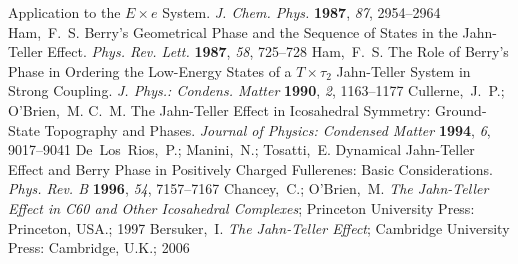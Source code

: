 \documentclass[superscriptaddress,showpacs,amsmath,amssymb,pra,twocolumn]{revtex4-1}
\begin{document}
\begin{thebibliography}{61}
  {{Application}} to the $E \times e$ System. \emph{J. Chem. Phys.} \textbf{1987}, \emph{87}, 2954--2964\relax
\mciteBstWouldAddEndPuncttrue
\mciteSetBstMidEndSepPunct{\mcitedefaultmidpunct}
{\mcitedefaultendpunct}{\mcitedefaultseppunct}\relax
\EndOfBibitem
{}
Ham,~F.~S. Berry's Geometrical Phase and the Sequence of States in the
  {{Jahn}}-{{Teller}} Effect. \emph{Phys. Rev. Lett.} \textbf{1987},
  \emph{58}, 725--728\relax
\mciteBstWouldAddEndPuncttrue
\mciteSetBstMidEndSepPunct{\mcitedefaultmidpunct}
{\mcitedefaultendpunct}{\mcitedefaultseppunct}\relax
\EndOfBibitem
{}
Ham,~F.~S. The Role of {{Berry}}'s Phase in Ordering the Low-Energy States of a
  $T \times \tau_2$ Jahn-Teller System in Strong Coupling. \emph{J. Phys.: Condens. Matter} \textbf{1990}, \emph{2}, 1163--1177\relax
\mciteBstWouldAddEndPuncttrue
\mciteSetBstMidEndSepPunct{\mcitedefaultmidpunct}
{\mcitedefaultendpunct}{\mcitedefaultseppunct}\relax
\EndOfBibitem
{}
Cullerne,~J.~P.; O'Brien,~M. C.~M. The {{Jahn}}-{{Teller}} Effect in
  Icosahedral Symmetry: Ground-State Topography and Phases. \emph{Journal of
  Physics: Condensed Matter} \textbf{1994}, \emph{6}, 9017--9041\relax
\mciteBstWouldAddEndPuncttrue
\mciteSetBstMidEndSepPunct{\mcitedefaultmidpunct}
{\mcitedefaultendpunct}{\mcitedefaultseppunct}\relax
\EndOfBibitem
{}
De~Los~Rios,~P.; Manini,~N.; Tosatti,~E. Dynamical {{Jahn}}-{{Teller}} Effect
  and {{Berry}} Phase in Positively Charged Fullerenes: {{Basic}}
  Considerations. \emph{Phys. Rev. B} \textbf{1996}, \emph{54},
  7157--7167\relax
\mciteBstWouldAddEndPuncttrue
\mciteSetBstMidEndSepPunct{\mcitedefaultmidpunct}
{\mcitedefaultendpunct}{\mcitedefaultseppunct}\relax
\EndOfBibitem
{}
Chancey,~C.; O'Brien,~M. \emph{The {{Jahn}}-{{Teller}} Effect in {{C60}} and
  Other Icosahedral Complexes}; {Princeton University Press: Princeton, USA.; 1997}\relax
\mciteBstWouldAddEndPuncttrue
\mciteSetBstMidEndSepPunct{\mcitedefaultmidpunct}
{\mcitedefaultendpunct}{\mcitedefaultseppunct}\relax
\EndOfBibitem
{}
Bersuker,~I. \emph{The {{Jahn}}-{{Teller Effect}}}; {Cambridge University
  Press: Cambridge, U.K.}; 2006\relax
\mciteBstWouldAddEndPuncttrue
\mciteSetBstMidEndSepPunct{\mcitedefaultmidpunct}
{\mcitedefaultendpunct}{\mcitedefaultseppunct}\relax

\end{thebibliography}
\end{document}
